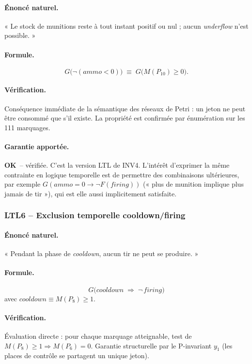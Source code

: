 \documentclass[11pt,a4paper]{article}
\newcommand{\OK}{\textcolor{green!50!black}{\textbf{OK}}}
\begin{document}
\paragraph{Énoncé naturel.}
« Le stock de munitions reste à tout instant positif ou nul ; aucun
\emph{underflow} n'est possible. »

\paragraph{Formule.}
\[
G\bigl(\neg(\textit{ammo} < 0)\bigr) \;\equiv\; G\bigl(M(P_{10}) \geq 0\bigr).
\]

\paragraph{Vérification.}
Conséquence immédiate de la sémantique des réseaux de Petri : un jeton ne
peut être consommé que s'il existe. La propriété est confirmée par
énumération sur les 111 marquages.

\paragraph{Garantie apportée.}
\OK\ -- vérifiée. C'est la version LTL de INV4. L'intérêt d'exprimer la
même contrainte en logique temporelle est de permettre des combinaisons
ultérieures, par exemple
$G(\textit{ammo} = 0 \rightarrow \neg F(\textit{firing}))$
(« plus de munition implique plus jamais de tir »), qui est elle aussi
implicitement satisfaite.

\subsubsection*{LTL6 -- Exclusion temporelle cooldown/firing}

\paragraph{Énoncé naturel.}
« Pendant la phase de \textit{cooldown}, aucun tir ne peut se produire. »

\paragraph{Formule.}
\[
G\bigl(\textit{cooldown} \;\Longrightarrow\; \neg\,\textit{firing}\bigr)
\]
avec $\textit{cooldown} \equiv M(P_8) \geq 1$.

\paragraph{Vérification.}
Évaluation directe : pour chaque marquage atteignable, test de
$M(P_8) \geq 1 \Rightarrow M(P_6) = 0$. Garantie structurelle par le
P-invariant $y_1$ (les places de contrôle se partagent un unique jeton).
\end{document}
